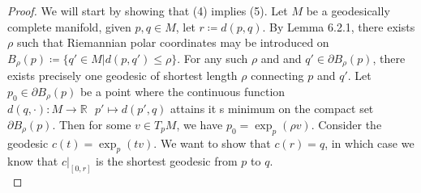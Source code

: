 \documentclass[11pt]{book}
\theoremstyle{break}
\theoremstyle{break}
\newcommand{\R}{\mathbb{R}}
\newcommand{\pd}{\partial}
\begin{document}
\begin{proof}
We will start by showing that (4) implies (5). Let $M$ be a geodesically complete manifold, given $p,q \in M$, let $r\coloneqq d(p,q)$. By Lemma 6.2.1, there exists $\rho$ such that Riemannian polar coordinates may be introduced on $B_\rho(p) \coloneqq \{ q' \in M | d(p,q') \leq \rho\}$. For any such $\rho$ and and $q' \in \pd B_{\rho}(p)$, there exists precisely one geodesic of shortest length $\rho$ connecting $p$ and $q'$. Let $p_0 \in \pd B_{\rho}(p)$ be a point where the continuous function $d(q,\cdot): M\to \R \ \ \ p'\mapsto d(p',q)$ attains it s minimum on the compact set $\pd B_{\rho}(p)$. Then for some $v \in T_pM$, we have $p_0 = \exp_p (\rho v)$. Consider the geodesic $c(t) = \exp_p (tv)$. We want to show that $c(r) = q$, in which case we know that $c|_{[0,r]}$ is the shortest geodesic from $p$ to $q$. \\


\end{proof}
\end{document}
